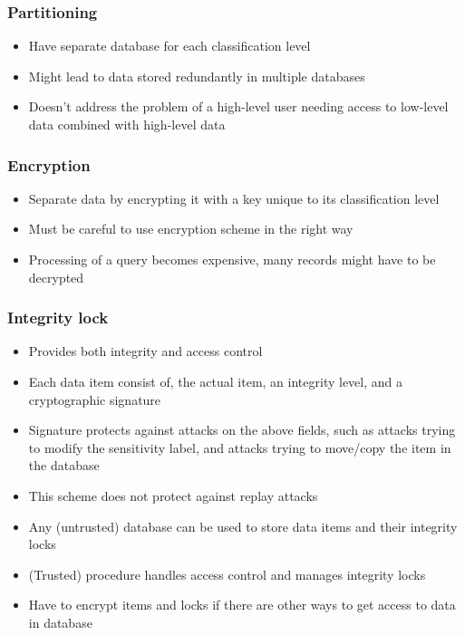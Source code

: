 \documentclass[twoside]{article}
\begin{document}
\subsubsection{Partitioning}
\begin{itemize}
\item Have separate database for each classification level
\item Might lead to data stored redundantly in multiple databases
\item Doesn’t address the problem of a high-level user needing access to low-level data combined with high-level data
\end{itemize}

\subsubsection{Encryption}
\begin{itemize}
\item Separate data by encrypting it with a key unique to its classification level
\item Must be careful to use encryption scheme in the right way
\item Processing of a query becomes expensive, many records might have to be decrypted
\end{itemize}

\subsubsection{Integrity lock}
\begin{itemize}
\item Provides both integrity and access control
\item Each data item consist of, the actual item, an integrity level, and a cryptographic signature
\item Signature protects against attacks on the above fields, such as attacks trying to modify the sensitivity label, and attacks trying to move/copy the item in the database
\item This scheme does not protect against replay attacks
\item Any (untrusted) database can be used to store data items and their integrity locks
\item (Trusted) procedure handles access control and manages integrity locks
\item Have to encrypt items and locks if there are other ways to get access to data in database
\end{itemize}
\end{document}
